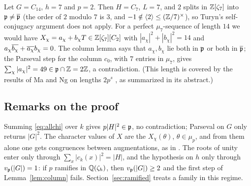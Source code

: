 \begin{example}\label{ex:C14}
Let $G=C_{14}$, $h=7$ and $p=2$. Then $H=C_7$, $L=7$, and $2$ splits in
$\mathbb{Z}[\zeta_7]$ into $\mathfrak{p}\ne\overline{\mathfrak{p}}$ (the order of $2$ modulo $7$ is $3$,
and $-1\notin\langle2\rangle\le(\mathbb{Z}/7)^\times$), so Turyn's
self-conjugacy argument does not apply. For a perfect $\mu_7$-sequence of
length $14$ we would have $X_\chi=a_\chi+b_\chi T\in\mathbb{Z}[\zeta_7][C_2]$
with $|a_\chi|^2+|b_\chi|^2=14$ and $a_\chi\overline{b_\chi}+\overline{a_\chi}b_\chi=0$.
The column lemma says that $a_\chi,b_\chi$ lie both in $\mathfrak{p}$ or both in
$\overline{\mathfrak{p}}$; the Parseval step for the column $c_0$, with $7$ entries in
$\mu_7$, gives $\sum_\chi|a_\chi|^2=49\in\mathfrak{p}\cap\mathbb{Z}=2\mathbb{Z}$, a contradiction.
(This length is covered by the results of Ma and Ng on lengths $2p^s$
\cite{MaNg2009}, as summarized in its abstract.)
\end{example}

\subsection{Remarks on the proof}

\begin{remark}\label{rem:single}
Summing \eqref{eq:allchi} over $k$ gives $p|H|^2\in\mathfrak{p}$, no
contradiction; Parseval on $G$ only returns $|G|^2$. The character values
of $X$ are the $X_\chi(\theta)$, $\theta\in\mu_p$, and from them alone one
gets congruences between augmentations, as in
\cite[Lemma~3.11]{LeungSchmidtZhang2023}. The roots of unity enter only
through $\sum_x|c_k(x)|^2=|H|$, and the hypothesis on $h$ only through
$v_{\mathfrak{p}}(|G|)=1$: if $p$ ramifies in $\mathbb{Q}(\zeta_h)$, then $v_{\mathfrak{p}}(|G|)\ge2$
and the first step of Lemma~\ref{lem:column} fails. Section~\ref{sec:ramified}
treats a family in this regime.
\end{remark}

